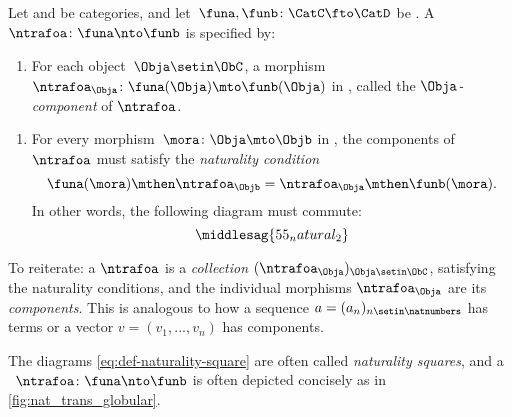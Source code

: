 \begin{ctdefinition}
    \label{def:natural-transformation}
    Let \CatC and \CatD be categories, and let~$\funa,\funb\colon \CatC\fto \CatD$ be .
    A ~$\ntrafoa \colon \funa \nto \funb$ is specified by:

    \constit
    \begin{enumerate}
        \item For each object~$\Obja\setin \ObC$, a morphism $\ntrafoa_\Obja \colon \funa(\Obja)\mto \funb(\Obja)$ in \CatD, called the $\Obja$\emph{-component} of $\ntrafoa$.
    \end{enumerate}
    \condit
    \begin{enumerate}
        \item For every morphism~$\mora\colon \Obja\mto \Objb$ in \CatC, the components of $\ntrafoa$ must satisfy the \emph{naturality condition}
              \begin{equation}
                  \funa(\mora)\mthen \ntrafoa_\Objb = \ntrafoa_\Obja\mthen \funb(\mora).
              \end{equation}
              In other words, the following diagram must commute:
              \begin{equation}
                  \label{eq:def-naturality-square}
                  \middlesag{55_natural_2}
              \end{equation}
    \end{enumerate}
\end{ctdefinition}

To reiterate: a  $\ntrafoa$ is a \emph{collection} $(\ntrafoa_\Obja)_{\Obja \setin \ObC}$, satisfying the naturality conditions, and the individual morphisms $\ntrafoa_\Obja$ are its \emph{components}.
This is analogous to how a sequence $a = (a_n)_{n \setin \natnumbers}$ has terms or a vector $v = (v_1, .
    .., v_n)$ has components.

\begin{marginfigure}
    \centering
    \caption{}
    \label{fig:nat_trans_globular}
\end{marginfigure}

The diagrams \cref{eq:def-naturality-square} are often called \emph{naturality squares}, and a ~$\ntrafoa \colon \funa\nto \funb$ is often depicted concisely as in \cref{fig:nat_trans_globular}.

\begin{figure}[h!]
    \centering
    \begin{ctdefinitionshade}
    \end{ctdefinitionshade}
    \caption{}
    \label{fig:nat_trans_graphically}
\end{figure}

